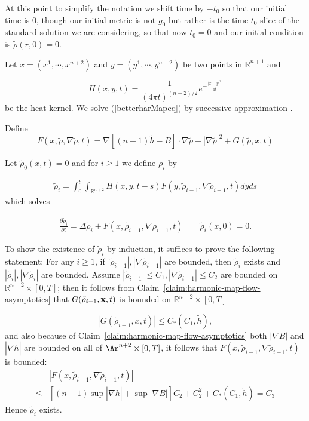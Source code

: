  At this point to simplify the notation we shift time by $-t_0$ so
that our initial time is $0$, though our initial metric is not $g_0$
but rather is the time $t_0$-slice of the standard solution we are
considering, so that now $t_0=0$ and our initial condition is
$\tilde \rho(r,0)=0$.

Let $x=(x^1,\cdots,x^{n+2})$ and $y=(y^1,\cdots,y^{n+2})$ be two
points in $\mathbb{R}^{n+1}$ and

\[
H(x,y,t)=\frac{1}{(4 \pi t)^{(n+2)/2}} e^{-\frac{|x-y|^2}{4t}}
\]
be the heat kernel. We solve (\ref{betterharMapeq}) by successive approximation
\cite{LiTam}.

Define
$$F(x, \tilde{\rho},\nabla\tilde{\rho},t)
=  \nabla \left[ (n-1)\tilde{h}-B \right] \cdot \nabla\tilde{\rho} +
\left | \nabla \tilde{\rho} \right |^2 +G( \tilde{\rho},x,t)
$$

Let $\tilde{\rho}_0(x,t)=0$ and for $i \geq 1$ we define
$\tilde{\rho}_i$ by

\begin{align}
\tilde{\rho}_i=\int_0^t \int_{\mathbb{R}^{n+2}}
H(x,y,t-s)F(y,\tilde{\rho}_{i-1}, \nabla\tilde{\rho}_{i-1} ,t)dyds
\label{rhoIntg}
\end{align}
which solves

\begin{align}
\frac{\partial\tilde{\rho}_i}{\partial t} = \Delta \tilde{\rho}_i +
F(x, \tilde{\rho}_{i-1},\nabla\tilde{\rho}_{i-1},t) \qquad
\tilde{\rho}_i(x,0)=0. \label{rhodiffeq}
\end{align}

To show the existence of $\tilde{\rho}_i$ by induction, it suffices
to prove the following statement: For any $i \geq 1$, if
$|\tilde{\rho}_{i-1}| , |\nabla \tilde{\rho}_{i-1}| $ are bounded,
then $\tilde{\rho}_i$ exists and $|\tilde{\rho}_{i}|, |\nabla
\tilde{\rho}_{i}|$ are bounded. Assume  $|\tilde{\rho}_{i-1}| \leq
C_1, |\nabla \tilde{\rho}_{i-1}| \leq C_2$ are bounded on
$\mathbb{R}^{n+2} \times [0,T]$; then it follows from
Claim~\ref{claim:harmonic-map-flow-asymptotics} that $G(\tilde{\rho}_{i-1},{\bf x},t)$ is bounded
on $\mathbb{R}^{n+2} \times [0,T]$

\[
|G(\tilde{\rho}_{i-1},x,t)| \leq C_*(C_1,\tilde{h} ),
\]
and also because of Claim~\ref{claim:harmonic-map-flow-asymptotics} both $|\nabla B|$ and
$|\nabla \tilde h|$ are bounded on all of $\Ar^{n+2}\times [0,T]$,
it follows that $F(x,
\tilde{\rho}_{i-1},\nabla\tilde{\rho}_{i-1},t)$ is bounded:
\begin{align*}
& |F(x, \tilde{\rho}_{i-1},\nabla\tilde{\rho}_{i-1},t)|  \\
\leq & \left[(n-1)\sup |\nabla \tilde{h}| + \sup |\nabla B|
\right]C_2+C_2^2+ C_*(C_1,\tilde{h} ) = C_3
\end{align*}
Hence $\tilde{\rho}_i$ exists.

